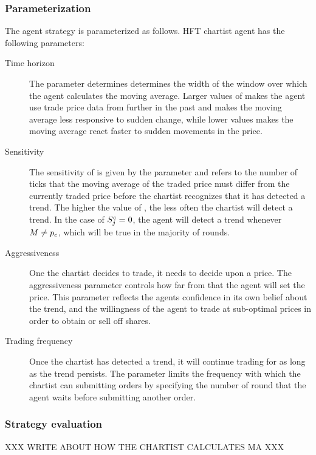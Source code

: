 \subsubsection{Parameterization}
The agent strategy is parameterized as follows. HFT chartist agent  has the following parameters:
\begin{description}
\item[Time horizon] The parameter  determines determines the width of the window over which the agent calculates the moving average. Larger values of  makes the agent use trade price data from further in the past and makes the moving average less responsive to sudden change, while lower values makes the moving average react faster to sudden movements in the price. 
\item[Sensitivity] The sensitivity of  is given by the parameter  and refers to the number of ticks that the moving average of the traded price must differ from the currently traded price before the chartist recognizes that it has detected a trend. The higher the value of , the less often the chartist will detect a trend. In the case of $S^c_{j} = 0$, the agent will detect a trend whenever $M \neq p_c$, which will be true in the majority of rounds.
\item[Aggressiveness] One the chartist decides to trade, it needs to decide upon a price. The aggressiveness parameter  controls how far from \currentprice that the agent will set the price. This parameter reflects the agents confidence in its own belief about the trend, and the willingness of the agent to trade at sub-optimal prices in order to obtain or sell off shares.
\item[Trading frequency] Once the chartist has detected a trend, it will continue trading for as long as the trend persists. The parameter  limits the frequency with which the chartist can submitting orders by specifying the number of round that the agent waits before submitting another order.
\end{description}

\subsubsection{Strategy evaluation}
XXX WRITE ABOUT HOW THE CHARTIST CALCULATES MA XXX

